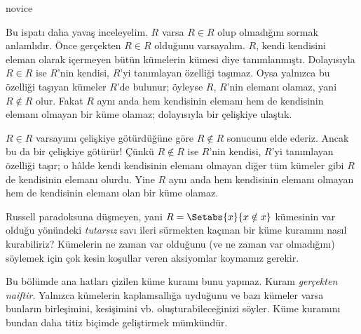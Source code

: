 \documentclass[../../../include/open-logic-section]{subfiles}
\begin{document}
\begin{tagblock}{novice}
\begin{explain}
Bu ispatı daha yavaş inceleyelim. $R$ varsa $R \in R$ olup olmadığını sormak
anlamlıdır. Önce gerçekten $R \in R$ olduğunu varsayalım. $R$, kendi kendisini
eleman olarak içermeyen bütün kümelerin kümesi diye tanımlanmıştı. Dolayısıyla
$R \in R$ ise $R$'nin kendisi, $R$'yi tanımlayan özelliği taşımaz. Oysa
yalnızca bu özelliği taşıyan kümeler $R$'de bulunur; öyleyse $R$, $R$'nin
elemanı olamaz, yani $R \notin R$ olur. Fakat $R$ aynı anda hem kendisinin elemanı hem de kendisinin
elemanı olmayan bir küme olamaz; dolayısıyla bir çelişkiye ulaştık.

$R \in R$ varsayımı çelişkiye götürdüğüne göre $R \notin R$ sonucunu elde
ederiz. Ancak bu da bir çelişkiye götürür!{} Çünkü $R \notin R$ ise $R$'nin
kendisi, $R$'yi tanımlayan özelliği taşır; o hâlde kendi kendisinin elemanı
olmayan diğer tüm kümeler gibi $R$ de kendisinin elemanı olurdu. Yine $R$
aynı anda hem kendisinin elemanı olmayan hem de kendisinin elemanı olan bir
küme olamaz.
\end{explain}
\end{tagblock}

\begin{digress}
Russell paradoksuna düşmeyen, yani
$R = \Setabs{x}{x \notin x}$ kümesinin var olduğu yönündeki \emph{tutarsız}
savı ileri sürmekten kaçınan bir küme kuramını nasıl kurabiliriz? Kümelerin ne
zaman var olduğunu (ve ne zaman var olmadığını) söylemek için çok kesin
koşullar veren aksiyomlar koymamız gerekir.
	
Bu bölümde ana hatları çizilen küme kuramı bunu yapmaz. Kuram
\emph{gerçekten naiftir}. Yalnızca kümelerin kaplamsallığa uyduğunu ve bazı
kümeler varsa bunların birleşimini, kesişimini vb. oluşturabileceğinizi
söyler. Küme kuramını bundan daha titiz biçimde geliştirmek mümkündür.
\end{digress}
\end{document}
